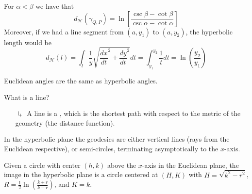 \documentclass[12pt, a4paper, oneside, openright, titlepage]{book}
\begin{document}
\begin{prop}
\begin{center}
    \end{center}
    For $\alpha < \beta$ we have that \begin{equation}
        d_{\mathcal{H}}(\gamma_{Q,P}) = \ln\left[\frac{\csc\beta - \cot\beta}{\csc\alpha - \cot\alpha}\right]
    \end{equation}
    Moreover, if we had a line segment from $(a,y_1)$ to $(a,y_2)$, the hyperbolic length would be \begin{equation}
        d_{\mathcal{H}}(l) = \int_{l}\frac{1}{y}\sqrt{\frac{dx}{dt}^2+\frac{dy}{dt}^2}dt = \int_{y_1}^{y_2}\frac{1}{t}dt = \ln\left(\frac{y_2}{y_1}\right)
    \end{equation}
\end{prop}

\begin{prop}
    Euclidean angles are the same as hyperbolic angles.
\end{prop}

\begin{qest}
    What is a line?
\end{qest}
\begin{enumerate}
    \item[$\drsh$] A line is a , which is the shortest path with respect to the metric of the geometry (the distance function). 
\end{enumerate}
\begin{thm}
    In the hyperbolic plane the geodesics are either vertical lines (rays from the Euclidean respective), or semi-circles, terminating asymptotically to the $x$-axis.
\end{thm}

\begin{rmk}
    Given a circle with center $(h,k)$ above the $x$-axis in the Euclidean plane, the image in the hyperbolic plane is a circle centered at $(H,K)$ with $H = \sqrt{k^2-r^2}$, $R = \frac{1}{2}\ln\left(\frac{k+r}{k-r}\right)$, and $K = k$.
\end{rmk}
\end{document}
